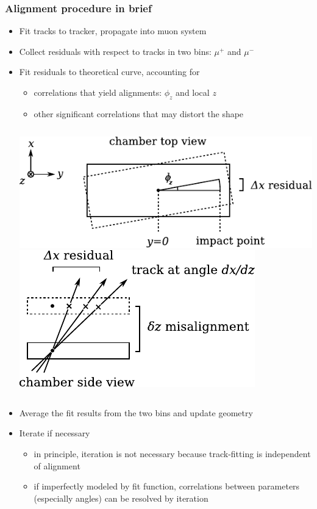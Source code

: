 \documentclass[compress]{beamer}
\begin{document}
\begin{frame}
\frametitle{Alignment procedure in brief}

\begin{itemize}
\item Fit tracks to tracker, propagate into muon system
\item Collect residuals with respect to tracks in two bins: $\mu^+$ and $\mu^-$
\item Fit residuals to theoretical curve, accounting for
\begin{itemize}
\item correlations that yield alignments: $\phi_z$ and local $z$
\item other significant correlations that may distort the shape
\end{itemize}

\vspace{0.25 cm}
\begin{columns}
\includegraphics[width=\linewidth]{phiz_diagram.pdf}
\includegraphics[width=\linewidth]{zpos_diagram.pdf}
\end{columns}

\vspace{0.25 cm}
\item Average the fit results from the two bins and update geometry
\item Iterate if necessary
\begin{itemize}
\item in principle, iteration is not necessary because track-fitting is independent of alignment
\item if imperfectly modeled by fit function, correlations between parameters (especially angles) can be resolved by iteration
\end{itemize}
\end{itemize}
\end{frame}
\end{document}
